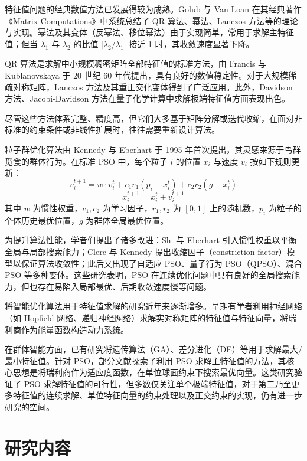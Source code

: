 特征值问题的经典数值方法已发展得较为成熟。Golub 与 Van Loan 在其经典著作《Matrix Computations》中系统总结了 QR 算法、幂法、Lanczos 方法等的理论与实现。幂法及其变体（反幂法、移位幂法）由于实现简单，常用于求解主特征值；但当 $\lambda_1$ 与 $\lambda_2$ 的比值 $|\lambda_2 / \lambda_1|$ 接近 1 时，其收敛速度显著下降。

QR 算法是求解中小规模稠密矩阵全部特征值的标准方法，由 Francis 与 Kublanovskaya 于 20 世纪 60 年代提出，具有良好的数值稳定性。对于大规模稀疏对称矩阵，Lanczos 方法及其重正交化变体得到了广泛应用。此外，Davidson 方法、Jacobi-Davidson 方法在量子化学计算中求解极端特征值方面表现出色。

尽管这些方法体系完整、精度高，但它们大多基于矩阵分解或迭代收缩，在面对非标准的约束条件或非线性扩展时，往往需要重新设计算法。

粒子群优化算法由 Kennedy 与 Eberhart 于 1995 年首次提出，其灵感来源于鸟群觅食的群体行为。在标准 PSO 中，每个粒子 $i$ 的位置 $x_i$ 与速度 $v_i$ 按如下规则更新：
\begin{equation}
 v_i^{t+1} = w \cdot v_i^t + c_1 r_1 (p_i - x_i^t) + c_2 r_2 (g - x_i^t)   
\end{equation}
\[
x_i^{t+1} = x_i^t + v_i^{t+1}
\]
其中 $w$ 为惯性权重，$c_1, c_2$ 为学习因子，$r_1, r_2$ 为 $[0,1]$ 上的随机数，$p_i$ 为粒子的个体历史最优位置，$g$ 为群体全局最优位置。

为提升算法性能，学者们提出了诸多改进：Shi 与 Eberhart 引入惯性权重以平衡全局与局部搜索能力；Clerc 与 Kennedy 提出收缩因子（constriction factor）模型以保证算法收敛性；此后又出现了自适应 PSO、量子行为 PSO（QPSO）、混合 PSO 等多种变体。这些研究表明，PSO 在连续优化问题中具有良好的全局搜索能力，但也存在易陷入局部最优、后期收敛速度慢等问题。

将智能优化算法用于特征值求解的研究近年来逐渐增多。早期有学者利用神经网络（如 Hopfield 网络、递归神经网络）求解实对称矩阵的特征值与特征向量，将瑞利商作为能量函数构造动力系统。

在群体智能方面，已有研究将遗传算法（GA）、差分进化（DE）等用于求解最大/最小特征值。针对 PSO，部分文献探索了利用 PSO 求解主特征值的方法，其核心思想是将瑞利商作为适应度函数，在单位球面约束下搜索最优向量。这类研究验证了 PSO 求解特征值的可行性，但多数仅关注单个极端特征值，对于第二乃至更多特征值的连续求解、单位特征向量的约束处理以及正交约束的实现，仍有进一步研究的空间。

\section{研究内容}

